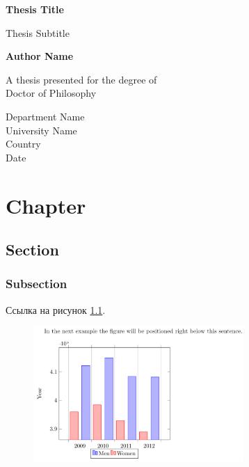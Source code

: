 \documentclass[xelatex]{G7-32-2017}
\begin{document}
\begin{titlepage}
    \begin{center}
        \vspace*{1cm}

        \textbf{Thesis Title}

        \vspace{0.5cm}
            Thesis Subtitle
                
        \vspace{1.5cm}

        \textbf{Author Name}

        \vfill
                
        A thesis presented for the degree of\\
        Doctor of Philosophy
                
        \vspace{0.8cm}
                
        Department Name\\
        University Name\\
        Country\\
        Date
    \end{center}
\end{titlepage}

\frontmatter

\tableofcontents

\Introduction

\lipsum[1-4]

\mainmatter

\chapter{Chapter}

\section{Section}

\subsection{Subsection}

\lipsum

Ссылка на рисунок \ref{ex:fig:1}.
\begin{figure}[h]
    \centering
    \includegraphics[width=8cm]{[NAME]/Plot}
    \caption{\lipsum[6][4-5]}
    \label{ex:fig:1}
\end{figure}
\end{document}
